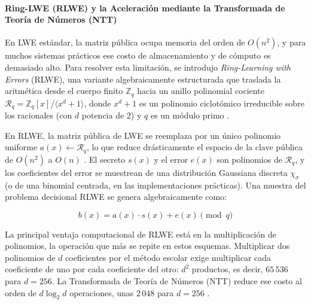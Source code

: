 \paragraph{Ring-LWE (RLWE) y la Aceleración mediante la Transformada de Teoría de Números (NTT)}
\label{sec:ntt}
En LWE estándar, la matriz pública ocupa memoria del orden de $O(n^2)$, y para muchos sistemas prácticos ese costo de almacenamiento y de cómputo es demasiado alto. Para resolver esta limitación, se introdujo \textit{Ring-Learning with Errors} (RLWE), una variante algebraicamente estructurada que traslada la aritmética desde el cuerpo finito $\mathbb{Z}_q$ hacia un anillo polinomial cociente $\mathcal{R}_q = \mathbb{Z}_q[x]/\langle x^d + 1 \rangle$, donde $x^d + 1$ es un polinomio ciclotómico irreducible sobre los racionales (con $d$ potencia de 2) y $q$ es un módulo primo \cite{nguyen2019high, mukil2026implementing}.

En RLWE, la matriz pública de LWE se reemplaza por un único polinomio uniforme $a(x) \leftarrow \mathcal{R}_q$, lo que reduce drásticamente el espacio de la clave pública de $O(n^2)$ a $O(n)$ \cite{nguyen2019high}. El secreto $s(x)$ y el error $e(x)$ son polinomios de $\mathcal{R}_q$, y los coeficientes del error se muestrean de una distribución Gaussiana discreta $\chi_\sigma$ (o de una binomial centrada, en las implementaciones prácticas). Una muestra del problema decisional RLWE se genera algebraicamente como:

\begin{equation}
b(x) = a(x) \cdot s(x) + e(x) \pmod q
\end{equation}

La principal ventaja computacional de RLWE está en la multiplicación de polinomios, la operación que más se repite en estos esquemas. Multiplicar dos polinomios de $d$ coeficientes por el método escolar exige multiplicar cada coeficiente de uno por cada coeficiente del otro: $d^2$ productos, es decir, $65\,536$ para $d = 256$. La Transformada de Teoría de Números (NTT) reduce ese costo al orden de $d \log_2 d$ operaciones, unas $2\,048$ para $d = 256$ \cite{nguyen2019high}.

